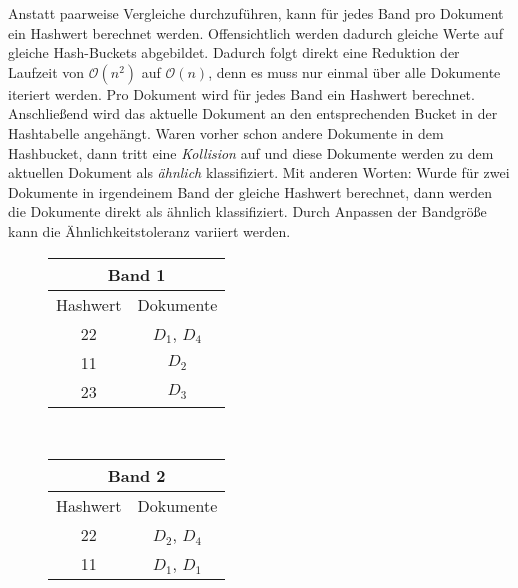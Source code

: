 Anstatt paarweise Vergleiche durchzuführen, kann für jedes Band pro Dokument ein Hashwert berechnet werden.
Offensichtlich werden dadurch gleiche Werte auf gleiche Hash-Buckets abgebildet.
Dadurch folgt direkt eine Reduktion der Laufzeit von $\mathcal{O}(n^2)$ auf $\mathcal{O}(n)$, denn es muss nur einmal über alle Dokumente iteriert werden.
Pro Dokument wird für jedes Band ein Hashwert berechnet.
Anschließend wird das aktuelle Dokument an den entsprechenden Bucket in der Hashtabelle angehängt.
Waren vorher schon andere Dokumente in dem Hashbucket, dann tritt eine  \textit{Kollision} auf und diese Dokumente werden zu dem aktuellen Dokument als \textit{ähnlich} klassifiziert.
Mit anderen Worten: Wurde für zwei Dokumente in irgendeinem Band der gleiche Hashwert berechnet, dann werden die Dokumente direkt als ähnlich klassifiziert.
Durch Anpassen der Bandgröße kann die Ähnlichkeitstoleranz variiert werden.
\begin{figure}
\centering
\begin{tabular}{|c|c|}
		\hline
		\multicolumn{2}{|c|}{Band 1} \\ 
		\hline
		Hashwert & Dokumente	 \\
		\hline

		22 & $D_1$, $D_4$ \\
		11 & $D_2$ \\
		23 & $D_3$ \\
		\hline
\end{tabular}
~
\begin{tabular}{|c|c|}
		\hline
		\multicolumn{2}{|c|}{Band 2} \\
		\hline
		Hashwert & Dokumente	 \\
		\hline
		22 & $D_2$, $D_4$ \\
		11 & $D_1$, $D_1$ \\
		\hline
\end{tabular}
\end{figure}


